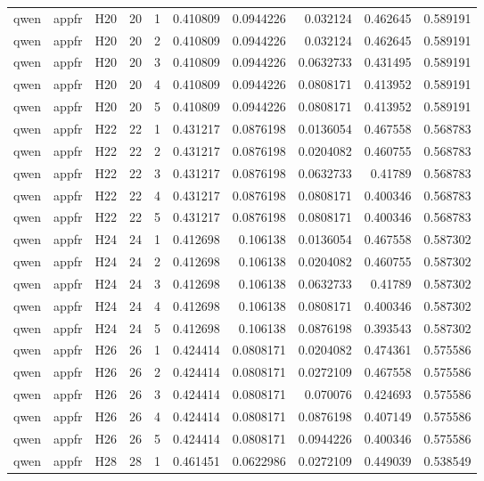 \begin{longtable}{lllrrrrrrr}
qwen & appfr & H20 & 20 & 1 & 0.410809 & 0.0944226 & 0.032124 & 0.462645 & 0.589191 \\
qwen & appfr & H20 & 20 & 2 & 0.410809 & 0.0944226 & 0.032124 & 0.462645 & 0.589191 \\
qwen & appfr & H20 & 20 & 3 & 0.410809 & 0.0944226 & 0.0632733 & 0.431495 & 0.589191 \\
qwen & appfr & H20 & 20 & 4 & 0.410809 & 0.0944226 & 0.0808171 & 0.413952 & 0.589191 \\
qwen & appfr & H20 & 20 & 5 & 0.410809 & 0.0944226 & 0.0808171 & 0.413952 & 0.589191 \\
qwen & appfr & H22 & 22 & 1 & 0.431217 & 0.0876198 & 0.0136054 & 0.467558 & 0.568783 \\
qwen & appfr & H22 & 22 & 2 & 0.431217 & 0.0876198 & 0.0204082 & 0.460755 & 0.568783 \\
qwen & appfr & H22 & 22 & 3 & 0.431217 & 0.0876198 & 0.0632733 & 0.41789 & 0.568783 \\
qwen & appfr & H22 & 22 & 4 & 0.431217 & 0.0876198 & 0.0808171 & 0.400346 & 0.568783 \\
qwen & appfr & H22 & 22 & 5 & 0.431217 & 0.0876198 & 0.0808171 & 0.400346 & 0.568783 \\
qwen & appfr & H24 & 24 & 1 & 0.412698 & 0.106138 & 0.0136054 & 0.467558 & 0.587302 \\
qwen & appfr & H24 & 24 & 2 & 0.412698 & 0.106138 & 0.0204082 & 0.460755 & 0.587302 \\
qwen & appfr & H24 & 24 & 3 & 0.412698 & 0.106138 & 0.0632733 & 0.41789 & 0.587302 \\
qwen & appfr & H24 & 24 & 4 & 0.412698 & 0.106138 & 0.0808171 & 0.400346 & 0.587302 \\
qwen & appfr & H24 & 24 & 5 & 0.412698 & 0.106138 & 0.0876198 & 0.393543 & 0.587302 \\
qwen & appfr & H26 & 26 & 1 & 0.424414 & 0.0808171 & 0.0204082 & 0.474361 & 0.575586 \\
qwen & appfr & H26 & 26 & 2 & 0.424414 & 0.0808171 & 0.0272109 & 0.467558 & 0.575586 \\
qwen & appfr & H26 & 26 & 3 & 0.424414 & 0.0808171 & 0.070076 & 0.424693 & 0.575586 \\
qwen & appfr & H26 & 26 & 4 & 0.424414 & 0.0808171 & 0.0876198 & 0.407149 & 0.575586 \\
qwen & appfr & H26 & 26 & 5 & 0.424414 & 0.0808171 & 0.0944226 & 0.400346 & 0.575586 \\
qwen & appfr & H28 & 28 & 1 & 0.461451 & 0.0622986 & 0.0272109 & 0.449039 & 0.538549 \\

\end{longtable}
